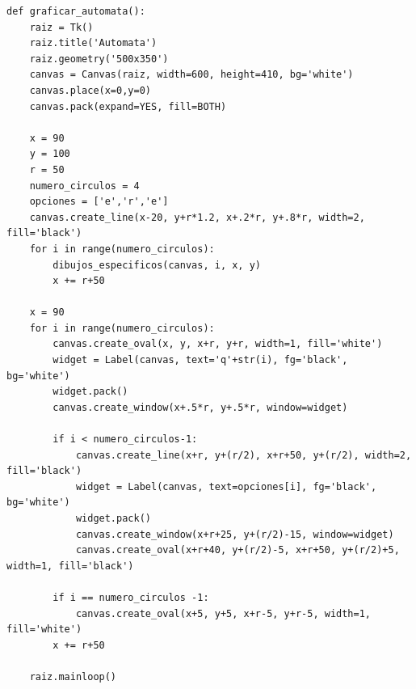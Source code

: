 \documentclass[12pt]{article}
\begin{document}
\begin{lstlisting}[frame=single]
def graficar_automata():
    raiz = Tk()
    raiz.title('Automata')
    raiz.geometry('500x350')
    canvas = Canvas(raiz, width=600, height=410, bg='white')
    canvas.place(x=0,y=0)
    canvas.pack(expand=YES, fill=BOTH)

    x = 90
    y = 100
    r = 50
    numero_circulos = 4
    opciones = ['e','r','e']
    canvas.create_line(x-20, y+r*1.2, x+.2*r, y+.8*r, width=2, fill='black')
    for i in range(numero_circulos):
        dibujos_especificos(canvas, i, x, y)
        x += r+50

    x = 90
    for i in range(numero_circulos):
        canvas.create_oval(x, y, x+r, y+r, width=1, fill='white')
        widget = Label(canvas, text='q'+str(i), fg='black', bg='white')
        widget.pack()
        canvas.create_window(x+.5*r, y+.5*r, window=widget)

        if i < numero_circulos-1:
            canvas.create_line(x+r, y+(r/2), x+r+50, y+(r/2), width=2, fill='black')
            widget = Label(canvas, text=opciones[i], fg='black', bg='white')
            widget.pack()
            canvas.create_window(x+r+25, y+(r/2)-15, window=widget)
            canvas.create_oval(x+r+40, y+(r/2)-5, x+r+50, y+(r/2)+5, width=1, fill='black')

        if i == numero_circulos -1:
            canvas.create_oval(x+5, y+5, x+r-5, y+r-5, width=1, fill='white')
        x += r+50

    raiz.mainloop()


\end{lstlisting}
\end{document}
